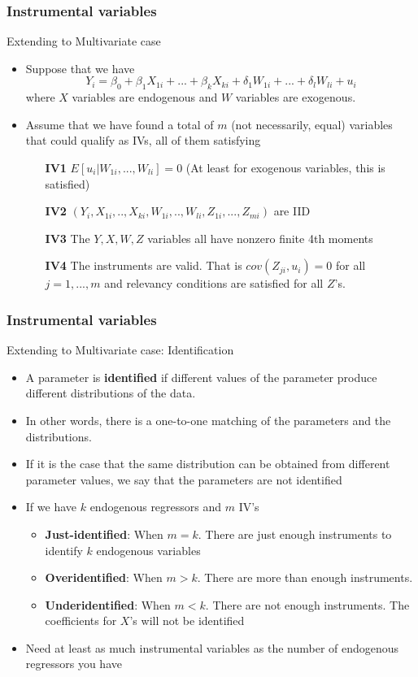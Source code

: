 \documentclass[compress]{beamer}
\begin{document}
\begin{frame}
\frametitle{Instrumental variables}
Extending to Multivariate case
\begin{itemize}
\item Suppose that we have
\[
Y_i = \beta_0 + \beta_1X_{1i} +...+ \beta_kX_{ki} + \delta_1W_{1i}+...+\delta_lW_{li}+u_i 
\]
where $X$ variables are endogenous and $W$ variables are exogenous. 
\item Assume that we have found a total of $m$ (not necessarily, equal) variables that could qualify as IVs, all of them satisfying 
\begin{itemize}
\item[\textbf{IV1}] $E[u_i|W_{1i},...,W_{li}]=0$ (At least for exogenous variables, this is satisfied)
\item[\textbf{IV2}] $(Y_i,X_{1i},..,X_{ki},W_{1i},..,W_{li},Z_{1i},...,Z_{mi})$ are IID
\item[\textbf{IV3}] The $Y,X,W,Z$ variables all have nonzero finite 4th moments
\item[\textbf{IV4}] The instruments are valid. That is $cov(Z_{ji},u_i)=0$ for all $j=1,...,m$ and relevancy conditions are satisfied for all $Z$'s. 
\end{itemize}
\end{itemize}
\end{frame}

\begin{frame}
\frametitle{Instrumental variables}
Extending to Multivariate case: Identification
\begin{itemize}
\item A parameter is \textbf{identified} if different values of the parameter produce different distributions of the data. 
\item In other words, there is a one-to-one matching of the parameters and the distributions.
\item If it is the case that the same distribution can be obtained from different parameter values, we say that the parameters are not identified
\item If we have $k$ endogenous regressors and $m$ IV's
\begin{itemize}
\item \textbf{Just-identified}: When $m=k$. There are just enough instruments to identify $k$ endogenous variables
\item \textbf{Overidentified}: When $m>k$. There are more than enough instruments.\item \textbf{Underidentified}: When $m<k$. There are not enough instruments. The coefficients for $X$'s will not be identified 
\end{itemize}
\item Need at least as much instrumental variables as the number of endogenous regressors you have
\end{itemize}
\end{frame}
\end{document}
